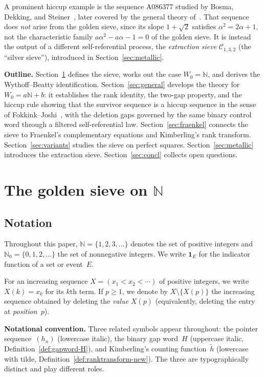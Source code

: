 \documentclass[11pt]{article}
\numberwithin{equation}{section}
\theoremstyle{plain}
\theoremstyle{definition}
\theoremstyle{remark}
\newcommand{\N}{\mathbb{N}}
\begin{document}
A prominent hiccup example is the sequence A086377 studied by Bosma,
Dekking, and Steiner~\cite{BDS2018}, later covered by the general
theory of~\cite{FJ2026}.  That sequence does \emph{not} arise from the
golden sieve, since its slope $1+\sqrt{2}$ satisfies $\alpha^2=2\alpha+1$,
not the characteristic family $a\alpha^2-a\alpha-1=0$ of the golden
sieve.  It is instead the output of a different self-referential
process, the \emph{extraction sieve} $\mathcal{C}_{1,3,2}$
(the ``silver sieve''),
introduced in Section~\ref{sec:metallic}.

\smallskip
\noindent\textbf{Outline.}
Section~\ref{sec:definition} defines the sieve, works out the case
$W_0=\N$, and derives the Wythoff--Beatty identification.
Section~\ref{sec:general} develops the theory for $W_0=a\N+b$: it
establishes the rank identity, the two-gap property, and the hiccup
rule showing that the survivor sequence is a hiccup sequence in the
sense of Fokkink--Joshi~\cite{FJ2026}, with the deletion gaps governed
by the same binary control word through a filtered self-referential law.
Section~\ref{sec:fraenkel} connects the sieve to Fraenkel's
complementary equations and Kimberling's rank transform.
Section~\ref{sec:variants} studies the sieve on perfect squares.
Section~\ref{sec:metallic} introduces the extraction sieve.
Section~\ref{sec:concl} collects open questions.


\section{The golden sieve on \texorpdfstring{$\N$}{N}}\label{sec:definition}

\subsection{Notation}
Throughout this paper, $\N=\{1,2,3,\ldots\}$ denotes the set of
positive integers and $\N_0=\{0,1,2,\ldots\}$ the set of nonnegative
integers.  We write $\mathbf{1}_E$ for the indicator function of a
set or event~$E$.

For an increasing sequence $X=(x_1<x_2<\cdots)$ of positive integers,
we write $X(k)=x_k$ for its $k$th term.
If $p\ge1$, we denote by $X\setminus\{X(p)\}$ the increasing sequence
obtained by deleting the \emph{value} $X(p)$ (equivalently, deleting the
entry at \emph{position}~$p$).

\smallskip\noindent\textbf{Notational convention.}
Three related symbols appear throughout: the pointer sequence~$(h_n)$
(lowercase italic), the binary gap word~$H$ (uppercase italic,
Definition~\ref{def:gapword-H}), and Kimberling's counting
function~$\tilde h$ (lowercase with tilde,
Definition~\ref{def:ranktransform-new}).  The three are typographically
distinct and play different roles.
\end{document}
